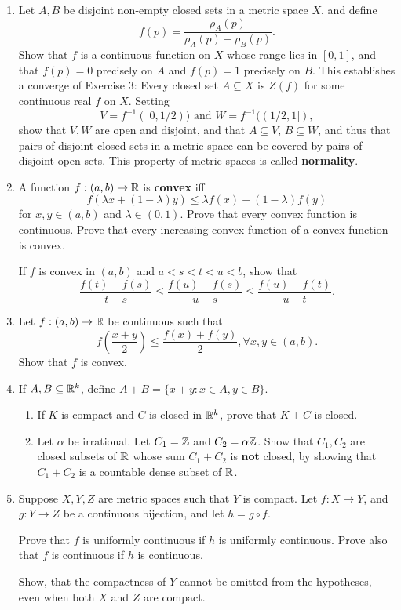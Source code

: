 \begin{enumerate}
\item %
Let $A, B$ be disjoint non-empty closed sets in a metric space $X$, and define
\[
    f(p) = \frac{\rho_A(p)}{\rho_A(p) + \rho_B(p)}.
\]
Show that $f$ is a continuous function on $X$ whose range lies in $[0, 1]$, and that $f(p) = 0$ precisely on $A$ and $f(p) = 1$ precisely on $B$. This establishes a converge of Exercise 3: Every closed set $A \subseteq X$ is $Z(f)$ for some continuous real $f$ on $X$. Setting 
\[
    V = f^{-1}([0, 1/2)) \text{ and } W = f^{-1}((1/2, 1]),
\]
show that $V, W$ are open and disjoint, and that $A \subseteq V$, $B \subseteq W$, and thus that pairs of disjoint closed sets in a metric space can be covered by pairs of disjoint open sets. This property of metric spaces is called \textbf{normality}.

\item %
A function $f: (a, b) \rightarrow \mathbb{R}$ is \textbf{convex} iff
\[
    f(\lambda x + (1 - \lambda) y) \le \lambda f(x) + (1 - \lambda) f(y)
\]
for $x, y \in (a, b)$ and $\lambda \in (0, 1)$. Prove that every convex function is continuous. Prove that every increasing convex function of a convex function is convex.

If $f$ is convex in $(a, b)$ and $a < s < t < u < b$, show that
\[
    \frac{f(t) - f(s)}{t - s} \le \frac{f(u) - f(s)}{u - s} \le \frac{f(u) - f(t)}{u - t}.
\]

\item %
Let $f: (a, b) \rightarrow \mathbb{R}$ be continuous such that
\[
    f\left(\frac{x+y}{2}\right) \le \frac{f(x) + f(y)}{2}, \forall x, y \in (a, b).
\]
Show that $f$ is convex.

\item %
If $A, B \subseteq \mathbb{R}^k$, define $A + B = \{x + y: x \in A, y \in B\}$.
\begin{enumerate}
\item If $K$ is compact and $C$ is closed in $\mathbb{R}^k$, prove that $K + C$ is closed.
\item Let $\alpha$ be irrational. Let $C_1 = \mathbb{Z}$ and $C_2 = \alpha\mathbb{Z}$. Show that $C_1, C_2$ are closed subsets of $\mathbb{R}$ whose sum $C_1 + C_2$ is \textbf{not} closed, by showing that $C_1 + C_2$ is a countable dense subset of $\mathbb{R}$.
\end{enumerate}

\item %
Suppose $X, Y, Z$ are metric spaces such that $Y$ is compact. Let $f: X \to Y$, and $g: Y \to Z$ be a continuous bijection, and let $h = g \circ f$.

Prove that $f$ is uniformly continuous if $h$ is uniformly continuous. Prove also that $f$ is continuous if $h$ is continuous. 

Show, that the compactness of $Y$ cannot be omitted from the hypotheses, even when both $X$ and $Z$ are compact.
\end{enumerate}

